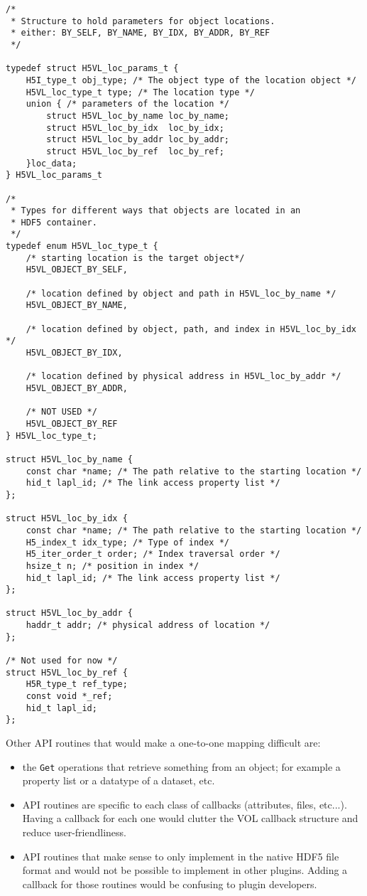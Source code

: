 \begin{lstlisting}[caption={Structure to hold parameters for object locations, H5VLpublic.h}, captionpos=b, label={lst:ObjLocclass}]
/* 
 * Structure to hold parameters for object locations.
 * either: BY_SELF, BY_NAME, BY_IDX, BY_ADDR, BY_REF 
 */

typedef struct H5VL_loc_params_t {
    H5I_type_t obj_type; /* The object type of the location object */
    H5VL_loc_type_t type; /* The location type */
    union { /* parameters of the location */
        struct H5VL_loc_by_name loc_by_name;
        struct H5VL_loc_by_idx  loc_by_idx;
        struct H5VL_loc_by_addr loc_by_addr;
        struct H5VL_loc_by_ref  loc_by_ref;
    }loc_data;
} H5VL_loc_params_t

/* 
 * Types for different ways that objects are located in an 
 * HDF5 container.
 */
typedef enum H5VL_loc_type_t {
    /* starting location is the target object*/
    H5VL_OBJECT_BY_SELF, 

    /* location defined by object and path in H5VL_loc_by_name */
    H5VL_OBJECT_BY_NAME, 

    /* location defined by object, path, and index in H5VL_loc_by_idx */
    H5VL_OBJECT_BY_IDX,

    /* location defined by physical address in H5VL_loc_by_addr */
    H5VL_OBJECT_BY_ADDR,

    /* NOT USED */
    H5VL_OBJECT_BY_REF
} H5VL_loc_type_t;

struct H5VL_loc_by_name {
    const char *name; /* The path relative to the starting location */
    hid_t lapl_id; /* The link access property list */
};

struct H5VL_loc_by_idx {
    const char *name; /* The path relative to the starting location */
    H5_index_t idx_type; /* Type of index */
    H5_iter_order_t order; /* Index traversal order */
    hsize_t n; /* position in index */
    hid_t lapl_id; /* The link access property list */
};

struct H5VL_loc_by_addr {
    haddr_t addr; /* physical address of location */
};

/* Not used for now */
struct H5VL_loc_by_ref {
    H5R_type_t ref_type;
    const void *_ref;
    hid_t lapl_id;
};
\end{lstlisting}

\newpage

Other API routines that would make a one-to-one mapping difficult are:
\begin{itemize} 
\item the \texttt{Get} operations that retrieve something from an object; for example a property list or a datatype of a dataset, etc.
\item API routines are specific to each class of callbacks (attributes, files, etc...). Having a callback for each one would clutter the VOL callback structure and reduce user-friendliness. 
\item API routines that make sense to only implement in the native HDF5 file format and would not be possible to implement in other plugins. Adding a callback for those routines would be confusing to plugin developers. 
\end{itemize}

